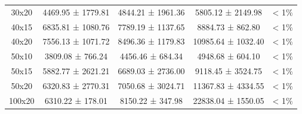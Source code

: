 \begin{table}[H]
\begin{tabular}{ccccc}
        30x20 & 4469.95 ± 1779.81 & 4844.21 ± 1961.36 & 5805.12 ± 2149.98 & < 1$\%$ \\
        40x15 & 6835.81 ± 1080.76 & 7789.19 ± 1137.65 & 8884.73 ± 862.80 & < 1$\%$ \\
        40x20 & 7556.13 ± 1071.72 & 8496.36 ± 1179.83 & 10985.64 ± 1032.40 & < 1$\%$ \\
        50x10 & 3809.08 ± 766.24 & 4456.46 ± 684.34 & 4948.68 ± 604.10 & < 1$\%$ \\
        50x15 & 5882.77 ± 2621.21 & 6689.03 ± 2736.00 & 9118.45 ± 3524.75 & < 1$\%$ \\
        50x20 & 6320.83 ± 2770.31 & 7050.68 ± 3024.71 & 11367.83 ± 4334.55 & < 1$\%$ \\
        100x20 & 6310.22 ± 178.01 & 8150.22 ± 347.98 & 22838.04 ± 1550.05 & < 1$\%$ \\
        \bottomrule
    \end{tabular}
\end{table}
    
